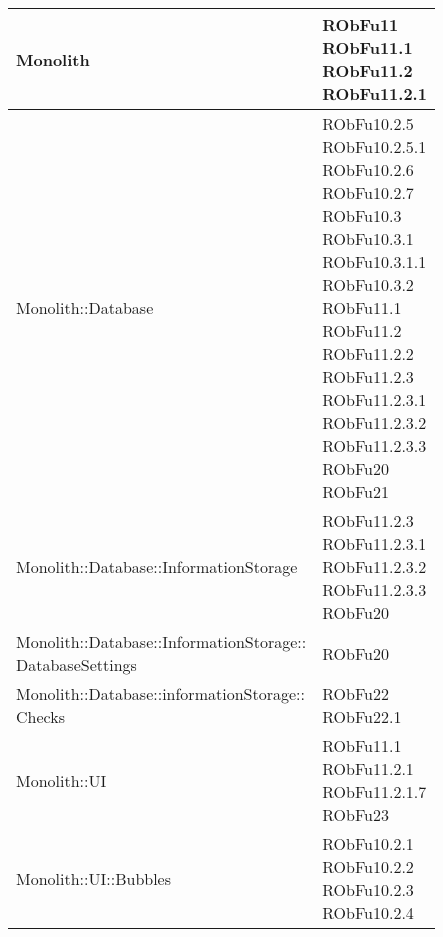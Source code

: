 \begin{center}
\begin{longtable}{|
*{1}{>{\centering\arraybackslash}p{7.5cm}|}
*{1}{>{\centering\arraybackslash}p{2.5cm}|}}
Monolith & \makecell{RObFu11
\\RObFu11.1
\\RObFu11.2
\\RObFu11.2.1
\\}\\\hline
Monolith::Database & \makecell{RObFu10.2.5
\\RObFu10.2.5.1
\\RObFu10.2.6
\\RObFu10.2.7
\\RObFu10.3
\\RObFu10.3.1
\\RObFu10.3.1.1
\\RObFu10.3.2
\\RObFu11.1
\\RObFu11.2
\\RObFu11.2.2
\\RObFu11.2.3
\\RObFu11.2.3.1
\\RObFu11.2.3.2
\\RObFu11.2.3.3
\\RObFu20
\\RObFu21
\\}\\\hline
Monolith::Database::InformationStorage & \makecell{RObFu11.2.3
\\RObFu11.2.3.1
\\RObFu11.2.3.2
\\RObFu11.2.3.3
\\RObFu20
\\}\\\hline
\makecell{Monolith::Database::InformationStorage:: \\ \hfill DatabaseSettings} & \makecell{RObFu20
\\}\\\hline
\makecell{Monolith::Database::informationStorage:: \\ \hfill Checks} & \makecell{RObFu22
\\RObFu22.1
\\}\\\hline
Monolith::UI & \makecell{RObFu11.1
\\RObFu11.2.1
\\RObFu11.2.1.7
\\RObFu23
\\}\\\hline
Monolith::UI::Bubbles & \makecell{RObFu10.2.1
\\RObFu10.2.2
\\RObFu10.2.3
\\RObFu10.2.4
}
\end{longtable}
\end{center}
